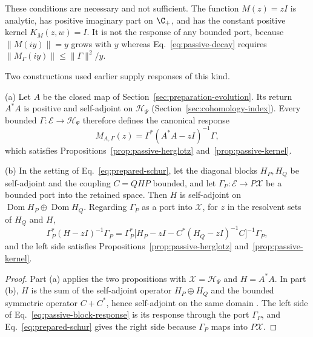 These conditions are necessary and not sufficient. The function $M(z)=zI$ is analytic, has positive imaginary part on $\C_+$, and has the constant positive kernel $K_M(z,w)=I$. It is not the response of any bounded port, because $\|M(iy)\|=y$ grows with $y$ whereas Eq.~\eqref{eq:passive-decay} requires $\|M_\Gamma(iy)\|\le\|\Gamma\|^2/y$.

Two constructions used earlier supply responses of this kind.

\begin{corollary}
\label{cor:passive-sources}
\textup{(a)} Let $A$ be the closed map of Section~\ref{sec:preparation-evolution}. Its return $A^*A$ is positive and self-adjoint on $\mathcal H_\Psi$ (Section~\ref{sec:cohomology-index}). Every bounded $\Gamma:\mathcal E\to\mathcal H_\Psi$ therefore defines the canonical response
\begin{equation}
 M_{A,\Gamma}(z)=\Gamma^*(A^*A-zI)^{-1}\Gamma ,
 \label{eq:passive-canonical-response}
\end{equation}
which satisfies Propositions~\ref{prop:passive-herglotz} and~\ref{prop:passive-kernel}.

\textup{(b)} In the setting of Eq.~\eqref{eq:prepared-schur}, let the diagonal blocks $H_P,H_Q$ be self-adjoint and the coupling $C=QHP$ bounded, and let $\Gamma_P:\mathcal E\to P\mathcal X$ be a bounded port into the retained space. Then $H$ is self-adjoint on $\operatorname{Dom}H_P\oplus\operatorname{Dom}H_Q$. Regarding $\Gamma_P$ as a port into $\mathcal X$, for $z$ in the resolvent sets of $H_Q$ and $H$,
\begin{equation}
 \Gamma_P^*(H-zI)^{-1}\Gamma_P
   =\Gamma_P^*\bigl[H_P-zI-C^*(H_Q-zI)^{-1}C\bigr]^{-1}\Gamma_P ,
 \label{eq:passive-block-response}
\end{equation}
and the left side satisfies Propositions~\ref{prop:passive-herglotz} and~\ref{prop:passive-kernel}.
\end{corollary}
\begin{proof}
Part (a) applies the two propositions with $\mathcal X=\mathcal H_\Psi$ and $H=A^*A$. In part (b), $H$ is the sum of the self-adjoint operator $H_P\oplus H_Q$ and the bounded symmetric operator $C+C^*$, hence self-adjoint on the same domain \cite{Kato}. The left side of Eq.~\eqref{eq:passive-block-response} is its response through the port $\Gamma_P$, and Eq.~\eqref{eq:prepared-schur} gives the right side because $\Gamma_P$ maps into $P\mathcal X$.
\end{proof}

